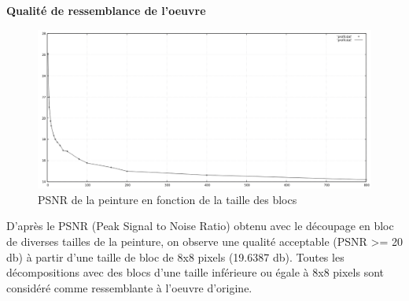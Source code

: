 \documentclass{beamer}
\begin{document}
\begin{frame}[t]
\begin{columns}[t]
\begin{column}{.49\linewidth}
                \vspace{.5cm}


                \begin{block}{\centering \textbf{Qualité de ressemblance de l'oeuvre}}
                    \vspace{.5cm}

                    \begin{center}
                        \begin{figure}[t]
                            \includegraphics[width=.5\linewidth]{rsc/psnr_ressemblance.png}
                            \caption{PSNR de la peinture en fonction de la taille des blocs}
                        \end{figure}
                    \end{center}

                    D'après le PSNR (Peak Signal to Noise Ratio) obtenu avec le découpage en bloc de diverses tailles de la peinture, on observe une qualité acceptable (PSNR >= 20 db) à partir d'une taille de bloc de 8x8 pixels (19.6387 db).
                    Toutes les décompositions avec des blocs d'une taille inférieure ou égale à 8x8 pixels sont considéré comme ressemblante à l'oeuvre d'origine.

                    \vspace{.5cm}
                \end{block}

                \vspace{.5cm}



\end{column}
\end{columns}
\end{frame}
\end{document}
